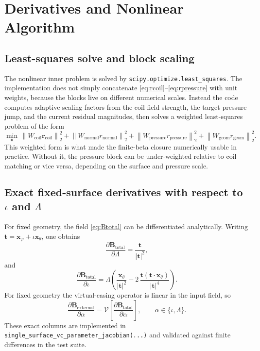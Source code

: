 \documentclass[11pt]{article}
\begin{document}
\section{Derivatives and Nonlinear Algorithm}
\subsection{Least-squares solve and block scaling}
The nonlinear inner problem is solved by \texttt{scipy.optimize.least\_squares}. The implementation does not simply concatenate \eqref{eq:rcoil}--\eqref{eq:rpressure} with unit weights, because the blocks live on different numerical scales. Instead the code computes adaptive scaling factors from the coil field strength, the target pressure jump, and the current residual magnitudes, then solves a weighted least-squares problem of the form
\begin{equation}
  \min_{\mathbf{u}} \, \left\| W_{\mathrm{coil}} \mathbf{r}_{\mathrm{coil}} \right\|_2^2 + \left\| W_{\mathrm{normal}} r_{\mathrm{normal}} \right\|_2^2 + \left\| W_{\mathrm{pressure}} r_{\mathrm{pressure}} \right\|_2^2 + \left\| W_{\mathrm{geom}} r_{\mathrm{geom}} \right\|_2^2.
\end{equation}
This weighted form is what made the finite-beta closure numerically usable in practice. Without it, the pressure block can be under-weighted relative to coil matching or vice versa, depending on the surface and pressure scale.

\subsection{Exact fixed-surface derivatives with respect to \texorpdfstring{$\iota$ and $\Lambda$}{iota and Lambda}}
For fixed geometry, the field \eqref{eq:Btotal} can be differentiated analytically. Writing $\mathbf{t}=\mathbf{x}_{\varphi}+\iota \mathbf{x}_{\theta}$, one obtains
\begin{equation}
  \frac{\partial \mathbf{B}_{\mathrm{total}}}{\partial \Lambda} = \frac{\mathbf{t}}{|\mathbf{t}|^2},
\end{equation}
and
\begin{equation}
  \frac{\partial \mathbf{B}_{\mathrm{total}}}{\partial \iota} =
  \Lambda\left(
    \frac{\mathbf{x}_{\theta}}{|\mathbf{t}|^2}
    - 2 \, \frac{\mathbf{t} (\mathbf{t} \cdot \mathbf{x}_{\theta})}{|\mathbf{t}|^4}
  \right).
\end{equation}
For fixed geometry the virtual-casing operator is linear in the input field, so
\begin{equation}
  \frac{\partial \mathbf{B}_{\mathrm{external}}}{\partial \alpha}
  = \mathcal{V}\left[\frac{\partial \mathbf{B}_{\mathrm{total}}}{\partial \alpha}\right],
  \qquad \alpha \in \{\iota,\Lambda\}.
\end{equation}
These exact columns are implemented in \texttt{single\_surface\_vc\_parameter\_jacobian(...)} and validated against finite differences in the test suite.
\end{document}
